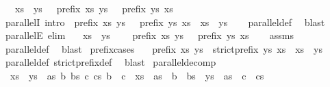 \begin{isabellebody}
\ \ \ {\isachardoublequoteopen}{\isacharparenleft}xs\ {\isasymparallel}\ ys{\isacharparenright}\ {\isacharequal}\ {\isacharparenleft}{\isasymnot}\ prefix\ xs\ ys\ {\isasymand}\ {\isasymnot}\ prefix\ ys\ xs{\isacharparenright}{\isachardoublequoteclose}\isanewline
\isanewline
{}\isamarkupfalse%
\ parallelI\ {\isacharbrackleft}intro{\isacharbrackright}{\isacharcolon}\ {\isachardoublequoteopen}{\isasymnot}\ prefix\ xs\ ys\ {\isasymLongrightarrow}\ {\isasymnot}\ prefix\ ys\ xs\ {\isasymLongrightarrow}\ xs\ {\isasymparallel}\ ys{\isachardoublequoteclose}\isanewline
%
\isadelimproof
\ \ %
\endisadelimproof
%
\isatagproof
{}\isamarkupfalse%
\ parallel{\isacharunderscore}def\ \isamarkupfalse%
\ blast%
\endisatagproof
{\isafoldproof}%
%
\isadelimproof
\isanewline
%
\endisadelimproof
\isanewline
{}\isamarkupfalse%
\ parallelE\ {\isacharbrackleft}elim{\isacharbrackright}{\isacharcolon}\isanewline
\ \ \ {\isachardoublequoteopen}xs\ {\isasymparallel}\ ys{\isachardoublequoteclose}\isanewline
\ \ \ {\isachardoublequoteopen}{\isasymnot}\ prefix\ xs\ ys\ {\isasymand}\ {\isasymnot}\ prefix\ ys\ xs{\isachardoublequoteclose}\isanewline
%
\isadelimproof
\ \ %
\endisadelimproof
%
\isatagproof
{}\isamarkupfalse%
\ assms\ \isamarkupfalse%
\ parallel{\isacharunderscore}def\ \isamarkupfalse%
\ blast%
\endisatagproof
{\isafoldproof}%
%
\isadelimproof
\isanewline
%
\endisadelimproof
\isanewline
{}\isamarkupfalse%
\ prefix{\isacharunderscore}cases{\isacharcolon}\isanewline
\ \ \ {\isachardoublequoteopen}prefix\ xs\ ys{\isachardoublequoteclose}\ {\isacharbar}\ {\isachardoublequoteopen}strict{\isacharunderscore}prefix\ ys\ xs{\isachardoublequoteclose}\ {\isacharbar}\ {\isachardoublequoteopen}xs\ {\isasymparallel}\ ys{\isachardoublequoteclose}\isanewline
%
\isadelimproof
\ \ %
\endisadelimproof
%
\isatagproof
{}\isamarkupfalse%
\ parallel{\isacharunderscore}def\ strict{\isacharunderscore}prefix{\isacharunderscore}def\ \isamarkupfalse%
\ blast%
\endisatagproof
{\isafoldproof}%
%
\isadelimproof
\isanewline
%
\endisadelimproof
\isanewline
{}\isamarkupfalse%
\ parallel{\isacharunderscore}decomp{\isacharcolon}\isanewline
\ \ {\isachardoublequoteopen}xs\ {\isasymparallel}\ ys\ {\isasymLongrightarrow}\ {\isasymexists}as\ b\ bs\ c\ cs{\isachardot}\ b\ {\isasymnoteq}\ c\ {\isasymand}\ xs\ {\isacharequal}\ as\ {\isacharat}\ b\ {\isacharhash}\ bs\ {\isasymand}\ ys\ {\isacharequal}\ as\ {\isacharat}\ c\ {\isacharhash}\ cs{\isachardoublequoteclose}\isanewline

\end{isabellebody}
